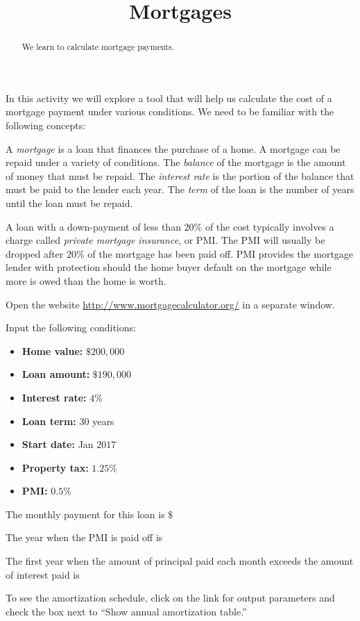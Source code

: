 \documentclass{ximera}
\title{Mortgages}
\begin{document}
\begin{abstract}
We learn to calculate mortgage payments.
\end{abstract}
\maketitle

In this activity we will explore a tool that will help us calculate the cost of a mortgage payment under various conditions. We need to be familiar with the following concepts:  

A \emph{mortgage} is a loan that finances the purchase of a home. A mortgage can be repaid under a variety of conditions. The \emph{balance} of the mortgage is the amount of money that must be repaid. The \emph{interest rate} is the portion of the balance that must be paid to the lender each year. The \emph{term} of the loan is the number of years until the loan must be repaid.

A loan with a down-payment of less than $20\%$ of the cost typically involves a charge called \emph{private mortgage insurance}, or PMI. The PMI will usually be dropped after $20\%$ of the mortgage has been paid off. PMI provides the mortgage lender with protection should the home buyer default on the mortgage while more is owed than the home is worth.

Open the website \href{http://www.mortgagecalculator.org/}{http://www.mortgagecalculator.org/} in a separate window. 

\begin{question}
Input the following conditions:
\begin{itemize}
\item\textbf{Home value:} $\$200,000$
\item\textbf{Loan amount:} $\$190,000$
\item\textbf{Interest rate:} $4$\%
\item\textbf{Loan term:} $30$ years
\item\textbf{Start date:} Jan $2017$
\item\textbf{Property tax:} $1.25\%$
\item\textbf{PMI:} $0.5\%$
\end{itemize}

The monthly payment for this loan is $\$$

The year when the PMI is paid off is 

The first year when the amount of principal paid each month exceeds the amount of interest paid is 

\begin{hint}
To see the amortization schedule, click on the link for output parameters and check the box next to ``Show annual amortization table.''
\end{hint}
\end{question}
\end{document}
